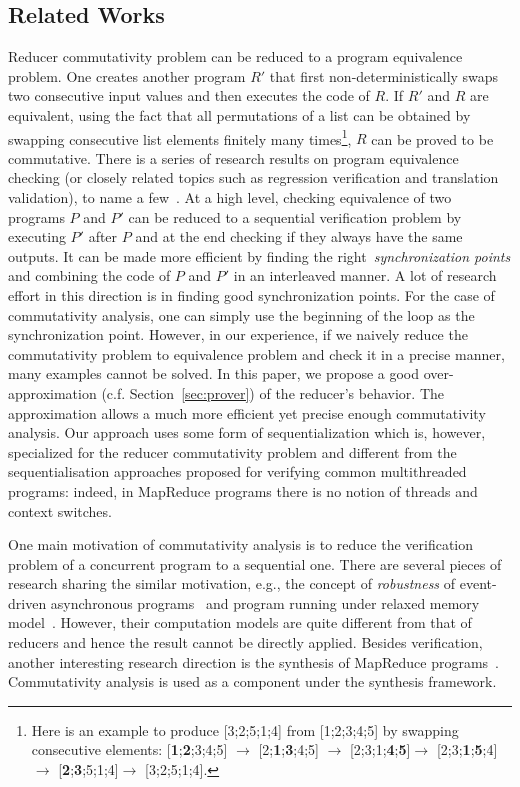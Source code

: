 \documentclass{llncs}
\begin{document}
\subsection*{Related Works}
Reducer commutativity problem can be reduced to a program equivalence problem. One creates another program $R'$ that first non-deterministically swaps two consecutive input values and then executes the code of $R$. If $R'$ and $R$ are equivalent, using the fact that all permutations of a list can be obtained by swapping consecutive list elements finitely many times\footnote{Here is an example to produce [3;2;5;1;4] from [1;2;3;4;5] by swapping consecutive elements: [\textbf{1};\textbf{2};3;4;5] $\rightarrow$ [2;\textbf{1};\textbf{3};4;5] $\rightarrow$ [2;3;1;\textbf{4};\textbf{5}]$\rightarrow$ [2;3;\textbf{1};\textbf{5};4]$\rightarrow$ [\textbf{2};\textbf{3};5;1;4]$\rightarrow$ [3;2;5;1;4].}, $R$ can be proved to be commutative. There is a series of research results on program equivalence checking (or closely related topics such as regression verification and translation validation), to name a few~\cite{Pnueli:1998:TV,fedyukovich2015automated,barthe2011relational,KlebanovRuemmerUlbrich2017}. At a high level, checking equivalence of two programs $P$ and $P'$ can be reduced to a sequential verification problem by executing $P'$ after $P$ and at the end checking if they always have the same outputs. It can be made more efficient by finding the right~\emph{synchronization points} and combining the code of $P$ and $P'$ in an interleaved manner. A lot of research effort in this direction is in finding good synchronization points. For the case of commutativity analysis, one can simply use the beginning of the loop as the synchronization point. However, in our experience, if we naively reduce the commutativity problem to equivalence problem and check it in a precise manner, many examples cannot be solved. In this paper, we propose a good over-approximation (c.f. Section~\ref{sec:prover}) of the reducer's behavior. The approximation allows a much more efficient yet precise enough commutativity analysis.
Our approach uses some form of sequentialization which is, however, specialized for the reducer commutativity problem and different from the sequentialisation approaches proposed for verifying common multithreaded programs\cite{XXX}: indeed, in MapReduce programs there is no notion of threads and context switches.

One main motivation of commutativity analysis is to reduce the verification problem of a concurrent program to a sequential one. There are several pieces of research sharing the similar motivation, e.g., the concept of \emph{robustness} of event-driven asynchronous programs~\cite{ahmed2017:robustness} and program running under relaxed memory model~\cite{ahmed2013:robustness,AbdullaACLR13,AbdullaACLR12}. However, their computation models are quite different from that of reducers and hence the result cannot be directly applied. Besides verification, another interesting research direction is the synthesis of MapReduce programs~\cite{SmithA16}. Commutativity analysis is used as a component under the synthesis framework.
\end{document}
